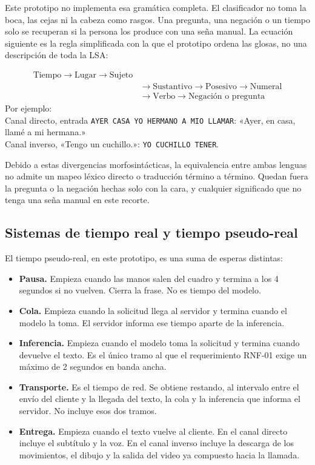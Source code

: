 Este prototipo no implementa esa gramática completa. El clasificador no toma la boca, las cejas ni la cabeza como rasgos. Una pregunta, una negación o un tiempo solo se recuperan si la persona los produce con una seña manual. La ecuación siguiente es la regla simplificada con la que el prototipo ordena las glosas, no una descripción de toda la LSA:

\begin{equation}
\begin{aligned}
\text{Tiempo} \rightarrow \text{Lugar} \rightarrow \text{Sujeto} \\
&\rightarrow \text{Sustantivo} \rightarrow \text{Posesivo} \rightarrow \text{Numeral} \\
&\rightarrow \text{Verbo} \rightarrow \text{Negación o pregunta}
\end{aligned}
\end{equation}
Por ejemplo: \\
Canal directo, entrada \texttt{AYER CASA YO HERMANO A MIO LLAMAR}: «Ayer, en casa, llamé a mi hermana.» \\
Canal inverso, «Tengo un cuchillo.»: \texttt{YO CUCHILLO TENER}.

Debido a estas divergencias morfosintácticas, la equivalencia entre ambas lenguas no admite un mapeo léxico directo o traducción término a término. Quedan fuera la pregunta o la negación hechas solo con la cara, y cualquier significado que no tenga una seña manual en este recorte.

\subsection{Sistemas de tiempo real y tiempo pseudo-real}
\label{sec:tiempo_pseudo}
El tiempo pseudo-real, en este prototipo, es una suma de esperas distintas:

\begin{itemize}
    \item \textbf{Pausa.} Empieza cuando las manos salen del cuadro y termina a los 4 segundos si no vuelven. Cierra la frase. No es tiempo del modelo.
    \item \textbf{Cola.} Empieza cuando la solicitud llega al servidor y termina cuando el modelo la toma. El servidor informa ese tiempo aparte de la inferencia.
    \item \textbf{Inferencia.} Empieza cuando el modelo toma la solicitud y termina cuando devuelve el texto. Es el único tramo al que el requerimiento RNF-01 exige un máximo de 2 segundos en banda ancha.
    \item \textbf{Transporte.} Es el tiempo de red. Se obtiene restando, al intervalo entre el envío del cliente y la llegada del texto, la cola y la inferencia que informa el servidor. No incluye esos dos tramos.
    \item \textbf{Entrega.} Empieza cuando el texto vuelve al cliente. En el canal directo incluye el subtítulo y la voz. En el canal inverso incluye la descarga de los movimientos, el dibujo y la salida del video ya compuesto hacia la llamada.
\end{itemize}

